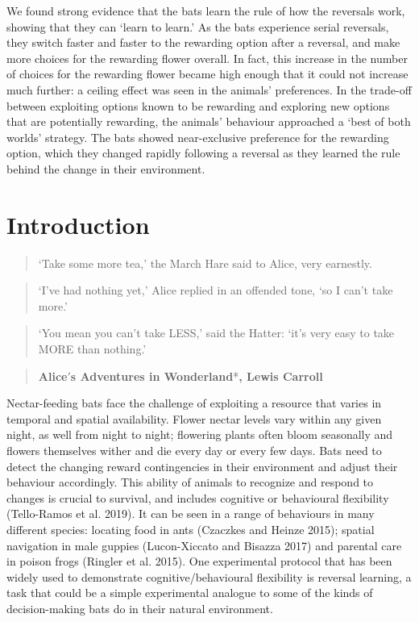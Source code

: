 \documentclass[
]{article}
\begin{document}
We found strong evidence that the bats learn the rule of how the reversals work, showing that they can `learn to learn.' As the bats experience serial reversals, they switch faster and faster to the rewarding option after a reversal, and make more choices for the rewarding flower overall. In fact, this increase in the number of choices for the rewarding flower became high enough that it could not increase much further: a ceiling effect was seen in the animals' preferences. In the trade-off between exploiting options known to be rewarding and exploring new options that are potentially rewarding, the animals' behaviour approached a `best of both worlds' strategy. The bats showed near-exclusive preference for the rewarding option, which they changed rapidly following a reversal as they learned the rule behind the change in their environment.

\hypertarget{introduction}{%
\section{Introduction}\label{introduction}}

\begin{quote}
`Take some more tea,' the March Hare said to Alice, very earnestly.
\end{quote}

\begin{quote}
`I've had nothing yet,' Alice replied in an offended tone, `so I can't take more.'
\end{quote}

\begin{quote}
`You mean you can't take LESS,' said the Hatter: `it's very easy to take MORE than nothing.'
\end{quote}

\begin{quote}
\hfill *\textbf{Alice\('\)s Adventures in Wonderland}*\textbf{, Lewis Carroll}
\end{quote}

Nectar-feeding bats face the challenge of exploiting a resource that varies in temporal and spatial availability. Flower nectar levels vary within any given night, as well from night to night; flowering plants often bloom seasonally and flowers themselves wither and die every day or every few days. Bats need to detect the changing reward contingencies in their environment and adjust their behaviour accordingly. This ability of animals to recognize and respond to changes is crucial to survival, and includes cognitive or behavioural flexibility (Tello-Ramos et al. 2019). It can be seen in a range of behaviours in many different species: locating food in ants (Czaczkes and Heinze 2015); spatial navigation in male guppies (Lucon-Xiccato and Bisazza 2017) and parental care in poison frogs (Ringler et al. 2015). One experimental protocol that has been widely used to demonstrate cognitive/behavioural flexibility is reversal learning, a task that could be a simple experimental analogue to some of the kinds of decision-making bats do in their natural environment.
\end{document}

